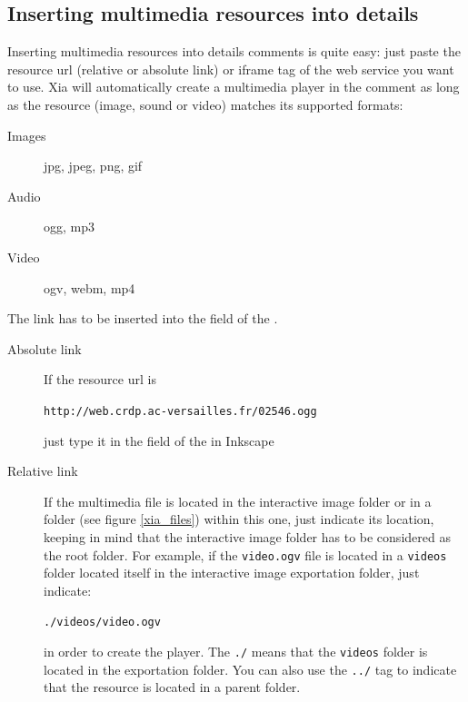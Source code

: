 \subsection{Inserting multimedia resources into details}\label{multimedia_enrichment}

Inserting multimedia resources into details comments is quite easy: just paste 
the resource url (relative or absolute link) or iframe tag of the web service 
you want to use. Xia will automatically create a multimedia player in the comment as long as 
the resource (image, sound or video) matches its supported formats: 
\begin{description}
 \item [Images] jpg, jpeg, png, gif
 \item [Audio] ogg, mp3
 \item [Video] ogv, webm, mp4
\end{description}

The link has to be inserted into the  field of the .

\begin{description}
 \item[Absolute link] If the resource url is
 
 \verb|http://web.crdp.ac-versailles.fr/02546.ogg|
 
 just type it in the  field of the  in 
 Inkscape
 
 \item [Relative link] If the multimedia file is located in the interactive image 
 folder or in a folder (see figure \ref{xia_files}) within this one, just indicate its location, keeping in 
 mind that the interactive image folder has to be considered as the root folder. 
 For example, if the \verb|video.ogv| file is located in a \verb|videos| 
 folder located itself in the interactive image exportation folder, just indicate:
 
  \verb|./videos/video.ogv|
 
  in order to create the player. The \verb|./| means that the \verb|videos| folder
  is located in the exportation folder. You can also use the \verb|../| tag to indicate
  that the resource is located in a parent folder.
\end{description}

